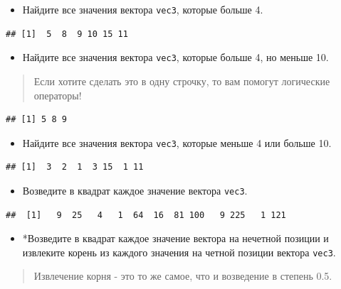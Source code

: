 \documentclass[]{book}
\providecommand{\tightlist}{%
  \setlength{\itemsep}{0pt}\setlength{\parskip}{0pt}}
\begin{document}
\begin{itemize}
\tightlist
\item
  Найдите все значения вектора \texttt{vec3}, которые больше 4.
\end{itemize}

\begin{verbatim}
## [1]  5  8  9 10 15 11
\end{verbatim}

\begin{itemize}
\tightlist
\item
  Найдите все значения вектора \texttt{vec3}, которые больше 4, но
  меньше 10.
\end{itemize}

\begin{quote}
Если хотите сделать это в одну строчку, то вам помогут логические
операторы!
\end{quote}

\begin{verbatim}
## [1] 5 8 9
\end{verbatim}

\begin{itemize}
\tightlist
\item
  Найдите все значения вектора \texttt{vec3}, которые меньше 4 или
  больше 10.
\end{itemize}

\begin{verbatim}
## [1]  3  2  1  3 15  1 11
\end{verbatim}

\begin{itemize}
\tightlist
\item
  Возведите в квадрат каждое значение вектора \texttt{vec3}.
\end{itemize}

\begin{verbatim}
##  [1]   9  25   4   1  64  16  81 100   9 225   1 121
\end{verbatim}

\begin{itemize}
\tightlist
\item
  *Возведите в квадрат каждое значение вектора на нечетной позиции и
  извлеките корень из каждого значения на четной позиции вектора
  \texttt{vec3}.
\end{itemize}

\begin{quote}
Извлечение корня - это то же самое, что и возведение в степень 0.5.
\end{quote}
\end{document}
